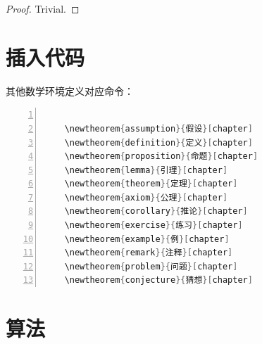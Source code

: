 \documentclass{cqupt_thesis}
\begin{document}
    \begin{proof}
        Trivial.
    \end{proof}


    \section{插入代码}
    其他数学环境定义对应命令：
    \begin{lstlisting}[language = java, numbers=left,
    numberstyle=\tiny,keywordstyle=\color{blue!70},
    commentstyle=\color{red!50!green!50!blue!50},frame=shadowbox,
    rulesepcolor=\color{red!20!green!20!blue!20},basicstyle=\ttfamily]

	\newtheorem{assumption}{假设}[chapter]
    \newtheorem{definition}{定义}[chapter]
    \newtheorem{proposition}{命题}[chapter]
    \newtheorem{lemma}{引理}[chapter]
    \newtheorem{theorem}{定理}[chapter]
    \newtheorem{axiom}{公理}[chapter]
    \newtheorem{corollary}{推论}[chapter]
    \newtheorem{exercise}{练习}[chapter]
    \newtheorem{example}{例}[chapter]
    \newtheorem{remark}{注释}[chapter]
    \newtheorem{problem}{问题}[chapter]
    \newtheorem{conjecture}{猜想}[chapter]

    \end{lstlisting}




    \section{算法}
\end{document}
